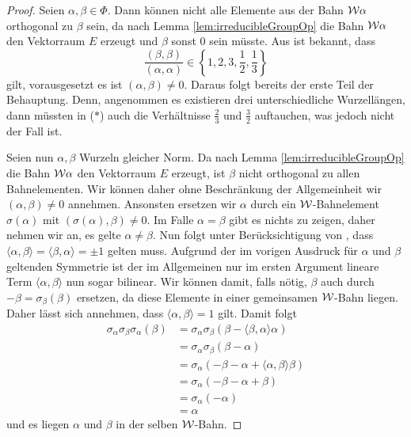 \begin{proof}
  Seien $\alpha, \beta \in \Phi$.
  Dann können nicht alle Elemente aus der Bahn $\mathcal{W}\alpha$ orthogonal zu $\beta$ sein, da nach Lemma \ref{lem:irreducibleGroupOp} die Bahn $\mathcal{W}\alpha$ den Vektorraum $E$ erzeugt und $\beta$ sonst $0$ sein müsste.
  Aus \cite[S.45]{humphreys1972introduction} ist bekannt, dass  
  \begin{displaymath}
    \frac{(\beta,\beta)}{(\alpha,\alpha)} \in \left\{1,2,3,\frac{1}{2},\frac{1}{3}\right\} \tag{$\ast$}
  \end{displaymath}
  gilt, vorausgesetzt es ist $(\alpha, \beta) \neq 0$.
  Daraus folgt bereits der erste Teil der Behauptung.
  Denn, angenommen es existieren drei unterschiedliche Wurzellängen, dann müssten in ($\ast$) auch die Verhältnisse $\tfrac{2}{3}$ und $\tfrac{3}{2}$ auftauchen, was jedoch nicht der Fall ist.

  Seien nun $\alpha, \beta$ Wurzeln gleicher Norm.
  Da nach Lemma \ref{lem:irreducibleGroupOp} die Bahn $\mathcal{W}\alpha$ den Vektorraum $E$ erzeugt, ist $\beta$ nicht orthogonal zu allen Bahnelementen.
  Wir können daher ohne Beschränkung der Allgemeinheit wir $(\alpha, \beta) \neq 0$ annehmen.
  Ansonsten ersetzen wir $\alpha$ durch ein $\mathcal{W}$\hyp{}Bahnelement $\sigma(\alpha)$ mit $(\sigma(\alpha), \beta) \neq 0$.
  Im Falle $\alpha = \beta$ gibt es nichts zu zeigen, daher nehmen wir an, es gelte $\alpha \neq \beta$.
  Nun folgt unter Berücksichtigung von \cite[S.45]{humphreys1972introduction}, dass $\langle \alpha, \beta \rangle = \langle \beta, \alpha \rangle = \pm 1$ gelten muss.
  Aufgrund der im vorigen Ausdruck für $\alpha$ und $\beta$ geltenden Symmetrie ist der im Allgemeinen nur im ersten Argument lineare Term $\langle \alpha, \beta \rangle$ nun sogar bilinear.
  Wir können damit, falls nötig, $\beta$ auch durch $-\beta = \sigma_\beta(\beta)$ ersetzen, da diese Elemente in einer gemeinsamen $\mathcal{W}$\hyp{}Bahn liegen.
  Daher lässt sich annehmen, dass $\langle \alpha, \beta \rangle = 1$ gilt.
  Damit folgt
  \begin{align*}
    \sigma_\alpha \sigma_\beta \sigma_\alpha(\beta) 
    &= \sigma_\alpha \sigma_\beta(\beta - \langle \beta, \alpha \rangle \alpha) \\
    &= \sigma_\alpha \sigma_\beta(\beta - \alpha) \\
    &= \sigma_\alpha (-\beta - \alpha + \langle \alpha, \beta \rangle \beta) \\
    &= \sigma_\alpha (-\beta - \alpha + \beta) \\
    &= \sigma_\alpha (-\alpha) \\
    &= \alpha
  \end{align*}
  und es liegen $\alpha$ und $\beta$ in der selben $\mathcal{W}$\hyp{}Bahn.
\end{proof} 


